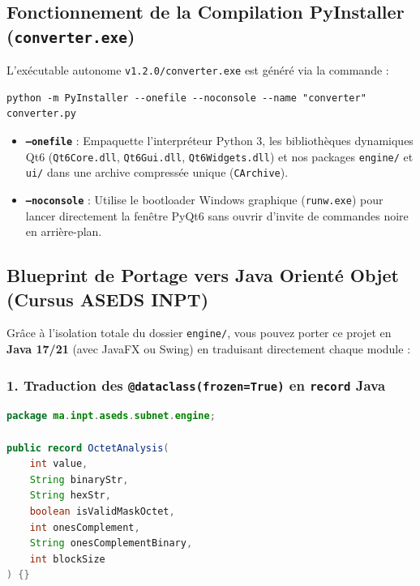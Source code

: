 \documentclass[11pt,a4paper]{article}
\begin{document}
\subsection{Fonctionnement de la Compilation PyInstaller (\texttt{converter.exe})}
L'exécutable autonome \texttt{v1.2.0/converter.exe} est généré via la commande :
\begin{lstlisting}
python -m PyInstaller --onefile --noconsole --name "converter" converter.py
\end{lstlisting}
\begin{itemize}
    \item \textbf{\texttt{--onefile}} : Empaquette l'interpréteur Python 3, les bibliothèques dynamiques Qt6 (\texttt{Qt6Core.dll}, \texttt{Qt6Gui.dll}, \texttt{Qt6Widgets.dll}) et nos packages \texttt{engine/} et \texttt{ui/} dans une archive compressée unique (\texttt{CArchive}).
    \item \textbf{\texttt{--noconsole}} : Utilise le bootloader Windows graphique (\texttt{runw.exe}) pour lancer directement la fenêtre PyQt6 sans ouvrir d'invite de commandes noire en arrière-plan.
\end{itemize}

\subsection{Blueprint de Portage vers Java Orienté Objet (Cursus ASEDS INPT)}
Grâce à l'isolation totale du dossier \texttt{engine/}, vous pouvez porter ce projet en \textbf{Java 17/21} (avec JavaFX ou Swing) en traduisant directement chaque module :

\subsubsection{1. Traduction des \texttt{@dataclass(frozen=True)} en \texttt{record} Java}
\begin{lstlisting}[language=Java, caption={Équivalent Java direct de OctetAnalysis et VlsmAllocation}]
package ma.inpt.aseds.subnet.engine;

public record OctetAnalysis(
    int value,
    String binaryStr,
    String hexStr,
    boolean isValidMaskOctet,
    int onesComplement,
    String onesComplementBinary,
    int blockSize
) {}
\end{lstlisting}
\end{document}

